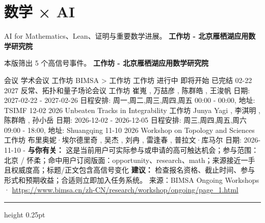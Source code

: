 \documentclass[10.5pt]{ctexart}
\begin{document}
\section*{数学 × AI}
{\color{ormuted} AI for Mathematics、Lean、证明与重要数学进展。}
\vspace{2mm}
{\LARGE\bfseries 工作坊 - 北京雁栖湖应用数学研究院}\par
\vspace{1mm}
{\color{ormuted} 本版筛出 5 个高信号事件。}
\vspace{3mm}
{\Large\bfseries 工作坊 - 北京雁栖湖应用数学研究院}\par
会议 学术会议 工作坊 BIMSA > 工作坊 工作坊 进行中 即将开始 已完结 02-22 2027 反常、拓扑和量子场论会议 工作坊 崔嵬 , 万喆彦 , 陈群皓 , 王浚帆 日期: 2027-02-22 - 2027-02-26 日程安排: 周一,周二,周三,周四,周五 00:00 - 00:00, 地址: TSIMF 12-02 2026 Unbeaten Tracks in Integrability 工作坊 Junya Yagi , 李淇明 , 陈群皓 , 孙小岳 日期: 2026-12-02 - 2026-12-05 日程安排: 周三,周四,周五,周六 09:00 - 18:00, 地址: Shuangqing 11-10 2026 Workshop on Topology and Sciences 工作坊 布里奥妮·埃尔德里奇 , 吴杰 , 刘冉 , 雷逢春 , 普拉文·库马尔 日期: 2026-11-10 - 
\textbf{与你有关：} 这是当前用户可实际参与或申请的高可触达机会；参与范围：北京 / 怀柔；命中用户订阅版面：opportunity、research、math；来源接近一手且权威度高；标题/正文包含高信号变化
\textbf{建议：} 检查报名资格、截止时间、参与形式和预期收益；合适则立即加入任务系统。
{\footnotesize\color{ormuted} 来源：BIMSA Ongoing Workshops · \url{https://www.bimsa.cn/zh-CN/research/workshop/ongoing/page_1.html}}
\vspace{4mm}
\hrule height 0.25pt
\vspace{3mm}
\end{document}
